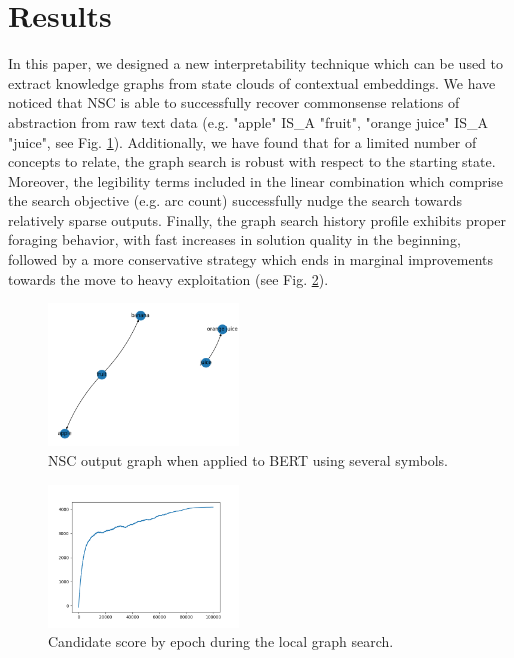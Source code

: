 \section{Results}\label{sec:results}

In this paper, we designed a new interpretability technique which can be used to extract knowledge graphs from state clouds of contextual embeddings. We have noticed that NSC is able to successfully recover commonsense relations of abstraction from raw text data (e.g. "apple" IS\_A "fruit", "orange juice" IS\_A "juice", see Fig. \ref{fig:nsc_output_graph}). Additionally, we have found that for a limited number of concepts to relate, the graph search is robust with respect to the starting state. Moreover, the legibility terms included in the linear combination which comprise the search objective (e.g. arc count) successfully nudge the search towards relatively sparse outputs. Finally, the graph search history profile exhibits proper foraging behavior, with fast increases in solution quality in the beginning, followed by a more conservative strategy which ends in marginal improvements towards the move to heavy exploitation (see Fig. \ref{fig:nsc_score_history}).

\begin{figure}[h]
    \centering
    \includegraphics[width=0.45\textwidth]{img/distinct graphs.png}
    \caption{NSC output graph when applied to BERT using several symbols.}\label{fig:nsc_output_graph}
\end{figure}

\begin{figure}[h]
    \centering
    \includegraphics[width=0.45\textwidth]{img/score1.png}
    \caption{Candidate score by epoch during the local graph search.}\label{fig:nsc_score_history}
\end{figure}

